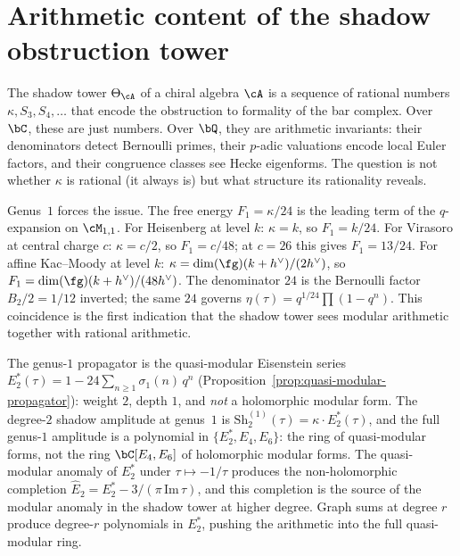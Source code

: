 %

\chapter{Arithmetic content of the shadow obstruction tower}
\label{chap:arithmetic-shadows}

\providecommand{\PhiFA}{\Phi^{\mathrm{FA}}}
\providecommand{\SpCh}{\mathrm{Sp}^{\mathrm{ch}}}

The shadow tower $\Theta_\cA$ of a chiral algebra $\cA$ is a
sequence of rational numbers $\kappa, S_3, S_4, \ldots$ that
encode the obstruction to formality of the bar complex. Over
$\bC$, these are just numbers. Over $\bQ$, they are arithmetic
invariants: their denominators detect Bernoulli primes, their
$p$-adic valuations encode local Euler factors, and their
congruence classes see Hecke eigenforms. The question is not
whether $\kappa$ is rational (it always is) but what structure
its rationality reveals.

Genus~$1$ forces the issue. The free energy
$F_1 = \kappa/24$ is the leading term of the $q$-expansion
on $\cM_{1,1}$. For Heisenberg at level $k$:
$\kappa = k$, so $F_1 = k/24$.
For Virasoro at central charge $c$: $\kappa = c/2$,
so $F_1 = c/48$; at $c = 26$ this gives $F_1 = 13/24$.
For affine Kac--Moody at level $k$:
$\kappa = \dim(\fg)(k + h^\vee)/(2h^\vee)$,
so $F_1 = \dim(\fg)(k + h^\vee)/(48 h^\vee)$.
The denominator $24$ is the Bernoulli factor
$B_2/2 = 1/12$ inverted; the same $24$ governs
$\eta(\tau) = q^{1/24}\prod(1 - q^n)$. This coincidence
is the first indication that the shadow tower sees modular
arithmetic together with rational arithmetic.

The genus-$1$ propagator is the quasi-modular Eisenstein series
$E_2^*(\tau) = 1 - 24\sum_{n \ge 1} \sigma_1(n)\,q^n$
(Proposition~\ref{prop:quasi-modular-propagator}): weight $2$,
depth $1$, and \emph{not} a holomorphic modular form.
The degree-$2$ shadow amplitude at genus~$1$ is
$\mathrm{Sh}_2^{(1)}(\tau) = \kappa \cdot E_2^*(\tau)$,
and the full genus-$1$ amplitude is a polynomial in
$\{E_2^*, E_4, E_6\}$: the ring of quasi-modular forms,
not the ring $\bC[E_4, E_6]$ of holomorphic modular forms.
The quasi-modular anomaly of $E_2^*$ under
$\tau \mapsto -1/\tau$ produces the non-holomorphic
completion $\widehat{E}_2 = E_2^* - 3/(\pi\,\mathrm{Im}\,\tau)$,
and this completion is the source of the modular
anomaly in the shadow tower at higher degree.
Graph sums at degree $r$ produce degree-$r$ polynomials
in $E_2^*$, pushing the arithmetic into the full
quasi-modular ring.


